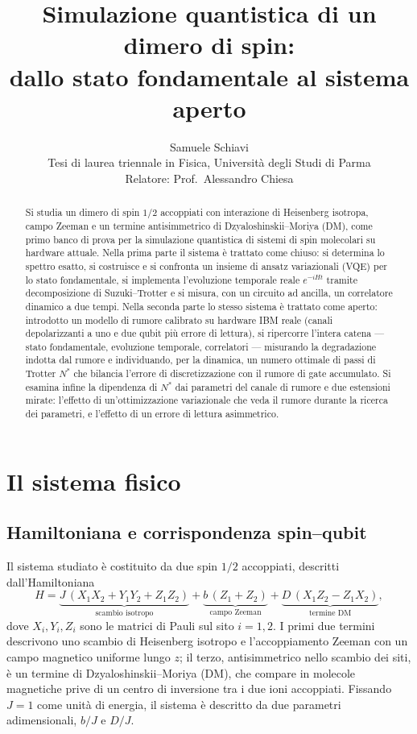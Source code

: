 \documentclass[11pt,a4paper]{article}
\title{\bfseries Simulazione quantistica di un dimero di spin:\\
dallo stato fondamentale al sistema aperto}
\author{Samuele Schiavi \\ \small Tesi di laurea triennale in Fisica, Università degli Studi di Parma \\ \small Relatore: Prof.\ Alessandro Chiesa}
\date{}
\begin{document}
\maketitle
\thispagestyle{fancy}

\begin{abstract}
\noindent
Si studia un dimero di spin $1/2$ accoppiati con interazione di Heisenberg
isotropa, campo Zeeman e un termine antisimmetrico di
Dzyaloshinskii--Moriya (DM), come primo banco di prova per la simulazione
quantistica di sistemi di spin molecolari su hardware attuale. Nella prima
parte il sistema è trattato come chiuso: si determina lo spettro esatto, si
costruisce e si confronta un insieme di ansatz variazionali (VQE) per lo
stato fondamentale, si implementa l'evoluzione temporale reale
$e^{-iHt}$ tramite decomposizione di Suzuki--Trotter e si misura, con un
circuito ad ancilla, un correlatore dinamico a due tempi. Nella seconda
parte lo stesso sistema è trattato come aperto: introdotto un modello di
rumore calibrato su hardware IBM reale (canali depolarizzanti a uno e due
qubit più errore di lettura), si ripercorre l'intera catena --- stato
fondamentale, evoluzione temporale, correlatori --- misurando la
degradazione indotta dal rumore e individuando, per la dinamica, un numero
ottimale di passi di Trotter $N^*$ che bilancia l'errore di
discretizzazione con il rumore di gate accumulato. Si esamina infine la
dipendenza di $N^*$ dai parametri del canale di rumore e due estensioni
mirate: l'effetto di un'ottimizzazione variazionale che veda il rumore
durante la ricerca dei parametri, e l'effetto di un errore di lettura
asimmetrico.
\end{abstract}

\tableofcontents

\bigskip

\section{Il sistema fisico}
\label{sec:sistema}

\subsection{Hamiltoniana e corrispondenza spin--qubit}

Il sistema studiato è costituito da due spin $1/2$ accoppiati, descritti
dall'Hamiltoniana
\begin{equation}
H = \underbrace{J\,(X_1X_2+Y_1Y_2+Z_1Z_2)}_{\text{scambio isotropo}}
  + \underbrace{b\,(Z_1+Z_2)}_{\text{campo Zeeman}}
  + \underbrace{D\,(X_1Z_2-Z_1X_2)}_{\text{termine DM}},
\label{eq:H}
\end{equation}
dove $X_i,Y_i,Z_i$ sono le matrici di Pauli sul sito $i=1,2$. I primi due
termini descrivono uno scambio di Heisenberg isotropo e l'accoppiamento
Zeeman con un campo magnetico uniforme lungo $z$; il terzo, antisimmetrico
nello scambio dei siti, è un termine di Dzyaloshinskii--Moriya (DM), che
compare in molecole magnetiche prive di un centro di inversione tra i due
ioni accoppiati. Fissando $J=1$ come unità di energia, il sistema è
descritto da due parametri adimensionali, $b/J$ e $D/J$.
\end{document}
